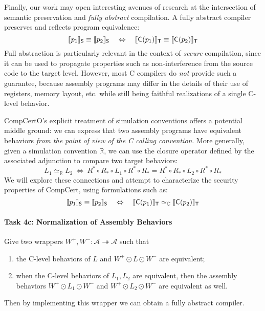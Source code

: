 Finally,
our work may open interesting avenues of research
at the intersection of
semantic preservation and \emph{fully abstract} compilation.
A fully abstract compiler preserves and reflects program equivalence:
\begin{equation} \label{eqn:fac}
  \llbracket p_1 \rrbracket_{ \mathsf{S} } \equiv
  \llbracket p_2 \rrbracket_{ \mathsf{S} }
  \quad \Leftrightarrow \quad
  \llbracket  \mathsf{C} (p_1) \rrbracket_{ \mathsf{T} } \equiv
  \llbracket  \mathsf{C} (p_2) \rrbracket_{ \mathsf{T} }
\end{equation}
Full abstraction is particularly relevant
in the context of \emph{secure} compilation,
since it can be used to propagate properties such as non-interference
from the source code to the target level.
However,
most C compilers do \emph{not} provide such a guarantee,
because assembly programs may differ in the details
of their use of registers, memory layout, etc.
while still being faithful realizations of a single C-level behavior.

CompCertO's explicit treatment of simulation conventions
offers a potential middle ground:
we can express that two assembly programs
have equivalent behaviors
\emph{from the point of view of the C calling convention}.
More generally,
given a simulation convention $\mathbb{R}$,
we can use the closure operator defined by the associated adjunction
to compare two target behaviors:
\[
  L_1 \simeq_\mathbb{R} L_2 \: \Leftrightarrow \:
  R^* \circ R_* \circ L_1 \circ R^* \circ R_* =
  R^* \circ R_* \circ L_2 \circ R^* \circ R_*
\]
We will explore these connections and attempt to characterize
the security properties of CompCert,
using formulations such as:
\[
  \llbracket p_1 \rrbracket_{ \mathsf{S} } \equiv
  \llbracket p_2 \rrbracket_{ \mathsf{S} }
  \quad \Leftrightarrow \quad
  \llbracket  \mathsf{C} (p_1) \rrbracket_{ \mathsf{T} } \simeq_\mathbb{C}
  \llbracket  \mathsf{C} (p_2) \rrbracket_{ \mathsf{T} }
\]

\vspace*{-2ex}
\paragraph*{Task 4c: Normalization of Assembly Behaviors}

Give two wrappers $W^+, W^- : \mathcal{A} \twoheadrightarrow \mathcal{A}$
such that
\begin{enumerate}
  \item the C-level behaviors of $L$ and $W^+ \odot L \odot W^-$
    are equivalent;
  \item when the C-level behaviors of $L_1, L_2$ are equivalent,
    then the assembly behaviors
    $W^+ \odot L_1 \odot W^-$ and
    $W^+ \odot L_2 \odot W^-$
    are equivalent as well.
\end{enumerate}
Then by implementing this wrapper
we can obtain a fully abstract compiler.
